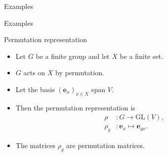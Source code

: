 \documentclass[10pt]{beamer}
\newcommand{\GL}{\text{GL}}
\newcommand{\Cyc}{\mathcal{C}}
\newcommand{\bas}{\mathbf{e}}
\begin{document}
\begin{frame}{Examples}
	\end{frame}
	\begin{frame}{Examples}
		\begin{block}{Permutation representation}
			\begin{itemize}
				\item Let $G$ be a finite group and let $X$ be a finite set.
				
				\item $G$ acts on $X$ by permutation.\pause
				
				\item Let the basis $(\bas_x)_{x \in X}$ span $V$.\pause
				
				\item Then the permutation representation is
				\begin{align*}
					\rho &: G \rightarrow \GL(V), \\
					\rho_g &: \bas_x \mapsto \bas_{gx}.
				\end{align*}\pause
				
				\item The matrices $\rho_g$ are \alert{permutation matrices}.
			\end{itemize}
		\end{block}
		
	\end{frame}
\end{document}
